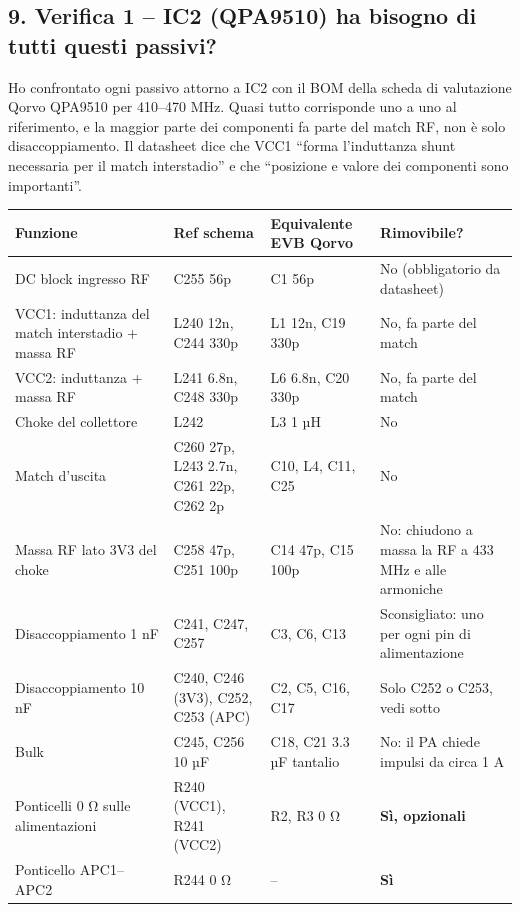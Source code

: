 \subsection[9. Verifica 1 – IC2 (QPA9510) ha bisogno di tutti questi passivi?]{9. Verifica 1 – IC2 (QPA9510) ha bisogno di tutti questi passivi? }

Ho confrontato ogni passivo attorno a IC2 con il BOM della scheda di valutazione Qorvo QPA9510 per 410–470 MHz. Quasi tutto corrisponde uno a uno al riferimento, e la maggior parte dei componenti fa parte del match RF, non è solo disaccoppiamento. Il datasheet dice che VCC1 \textquotedblleft{}forma l'induttanza shunt necessaria per il match interstadio\textquotedblright{} e che \textquotedblleft{}posizione e valore dei componenti sono importanti\textquotedblright{}.

{\footnotesize{}\setlength{\tabcolsep}{4pt}\renewcommand{\arraystretch}{1.1}
\begin{longtable}{>{\raggedright\arraybackslash}p{}>{\raggedright\arraybackslash}p{}>{\raggedright\arraybackslash}p{}>{\raggedright\arraybackslash}p{}}
\toprule
\textbf{Funzione} & \textbf{Ref schema} & \textbf{Equivalente EVB Qorvo} & \textbf{Rimovibile?} \\
\midrule
\endhead
\bottomrule\endfoot
DC block ingresso RF & C255 56p & C1 56p & No (obbligatorio da datasheet) \\\midrule[0.15pt]
VCC1: induttanza del match interstadio + massa RF & L240 12n, C244 330p & L1 12n, C19 330p & No, fa parte del match \\\midrule[0.15pt]
VCC2: induttanza + massa RF & L241 6.8n, C248 330p & L6 6.8n, C20 330p & No, fa parte del match \\\midrule[0.15pt]
Choke del collettore & L242 & L3 1 µH & No \\\midrule[0.15pt]
Match d'uscita & C260 27p, L243 2.7n, C261 22p, C262 2p & C10, L4, C11, C25 & No \\\midrule[0.15pt]
Massa RF lato 3V3 del choke & C258 47p, C251 100p & C14 47p, C15 100p & No: chiudono a massa la RF a 433 MHz e alle armoniche \\\midrule[0.15pt]
Disaccoppiamento 1 nF & C241, C247, C257 & C3, C6, C13 & Sconsigliato: uno per ogni pin di alimentazione \\\midrule[0.15pt]
Disaccoppiamento 10 nF & C240, C246 (3V3), C252, C253 (APC) & C2, C5, C16, C17 & Solo C252 o C253, vedi sotto \\\midrule[0.15pt]
Bulk & C245, C256 10 µF & C18, C21 3.3 µF tantalio & No: il PA chiede impulsi da circa 1 A \\\midrule[0.15pt]
Ponticelli 0 Ω sulle alimentazioni & R240 (VCC1), R241 (VCC2) & R2, R3 0 Ω & \textbf{Sì, opzionali} \\\midrule[0.15pt]
Ponticello APC1–APC2 & R244 0 Ω & – & \textbf{Sì} \\
\end{longtable}}

